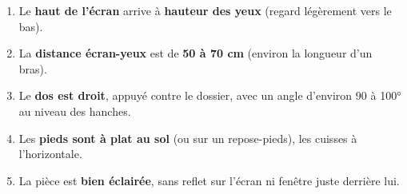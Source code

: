 \documentclass[11pt]{article}
\begin{document}
\begin{aretenir}
\begin{enumerate}
  \item Le \textbf{haut de l'écran} arrive à \textbf{hauteur des yeux} (regard légèrement vers le bas).
  \item La \textbf{distance écran-yeux} est de \textbf{50 à 70 cm} (environ la longueur d'un bras).
  \item Le \textbf{dos est droit}, appuyé contre le dossier, avec un angle d'environ 90 à 100° au niveau des hanches.
  \item Les \textbf{pieds sont à plat au sol} (ou sur un repose-pieds), les cuisses à l'horizontale.
  \item La pièce est \textbf{bien éclairée}, sans reflet sur l'écran ni fenêtre juste derrière lui.
\end{enumerate}
\end{aretenir}
\end{document}

